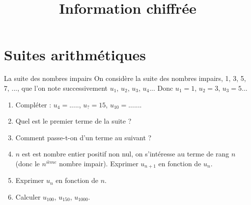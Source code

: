 \documentclass[12pt,a4paper]{article}
\date{}
\title{Information chiffrée }
\begin{document}




\section{Suites arithmétiques}

\begin{myact}{La suite des nombres impairs}
	On considère la suite des nombres impairs, 1, 3, 5, 7, ..., que l'on note successivement $u_1$, $u_2$, $u_3$, $u_4$...
	Donc $u_1=1$, $u_2=3$, $u_3=5$...\\
	
	\begin{enumerate}
		\item Compléter : $u_4=.....$, $u_? =15$, $u_{10}=......$.
		\item Quel est le premier terme de la suite ?
		\item Comment passe-t-on d'un terme au suivant ?
		\item $n$ est est nombre entier positif non nul, on s'intéresse au terme de rang $n$ (donc le $n^{ième}$ nombre impair). Exprimer $u_{n+1}$ en fonction de $u_n$.
		\item Exprimer $u_n$ en fonction de $n$.
		\item Calculer $u_{100}$, $u_{150}$, $u_{1000}$.
	\end{enumerate}
	
\end{myact}
\end{document}
